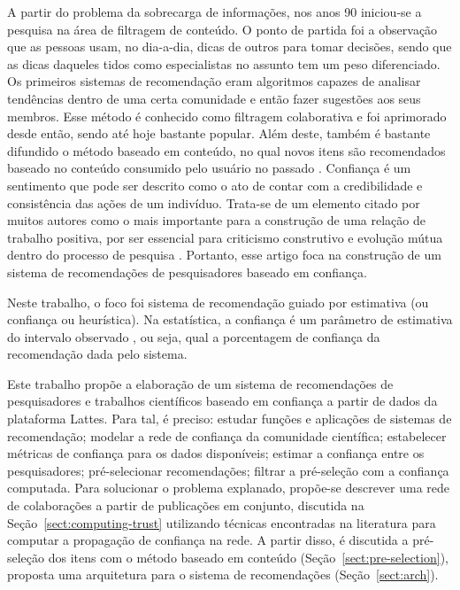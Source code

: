 \documentclass[12pt]{article}
\begin{document}
A partir do problema da sobrecarga de informações, nos anos 90 iniciou-se a pesquisa na área de filtragem de conteúdo. O ponto de partida foi a observação que as pessoas usam, no dia-a-dia, dicas de outros para tomar decisões, sendo que as dicas daqueles tidos como especialistas no assunto tem um peso diferenciado. Os primeiros sistemas de recomendação eram algoritmos capazes de analisar tendências dentro de uma certa comunidade e então fazer sugestões aos seus membros. Esse método é conhecido como filtragem colaborativa e foi aprimorado desde então, sendo até hoje bastante popular. Além deste, também é bastante difundido o método baseado em conteúdo, no qual novos itens são recomendados baseado no conteúdo consumido pelo usuário no passado \cite{ricci2011introduction}. Confiança é um sentimento que pode ser descrito como o ato de contar com a credibilidade e consistência das ações de um indivíduo. Trata-se de um elemento citado por muitos autores como o mais importante para a construção de uma relação de trabalho positiva, por ser essencial para criticismo construtivo e evolução mútua dentro do processo de pesquisa \cite{bagshaw2007international}. Portanto, esse artigo foca na construção de um sistema de recomendações de pesquisadores baseado em confiança.

Neste trabalho, o foco foi sistema de recomendação guiado por estimativa (ou confiança ou heurística). Na estatística, a confiança é um parâmetro
de estimativa do intervalo observado \cite{ekstrand2019recommender}, ou seja, qual a porcentagem de confiança da recomendação dada pelo sistema.

Este trabalho propõe a elaboração de um sistema de recomendações de pesquisadores e trabalhos científicos baseado em confiança a partir de dados da plataforma Lattes. Para tal, é preciso: estudar funções e aplicações de sistemas de recomendação; modelar a rede de confiança da comunidade científica; estabelecer métricas de confiança para os dados disponíveis; estimar a confiança entre os pesquisadores; pré-selecionar recomendações; filtrar a pré-seleção com a confiança computada. Para solucionar o problema explanado, propõe-se descrever uma rede de colaborações a partir de publicações em conjunto, discutida na Seção~\ref{sect:computing-trust} utilizando técnicas encontradas na literatura para computar a propagação de confiança na rede. A partir disso, é discutida a pré-seleção dos itens com o método baseado em conteúdo (Seção~\ref{sect:pre-selection}), proposta uma arquitetura para o sistema de recomendações (Seção~\ref{sect:arch}).
\end{document}
